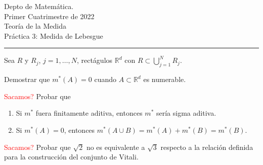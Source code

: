 \documentclass{book}
\newcommand{\rr}{\mathbb{R}}
\begin{document}


\begin{large}
\begin{bfseries} %
        \noindent Depto de Matem\'atica.\\
        Primer Cuatrimestre de 2022\\                                                                                                                                                                                                                                                                                                                                                
        Teoría de la Medida \\
        Práctica 3: Medida de Lebesgue

\end{bfseries}
\end{large}
\par\noindent\rule{\textwidth}{.5pt}










\begin{ejer}{} Sea $R$ y $R_j$, $j=1,\ldots,N$, rectágulos  $\rr^d$ con $R\subset \bigcup\limits_{j=1}^NR_j$. 
 
\end{ejer}


\begin{ejer}{}  Demostrar que  $m^*(A)=0$  cuando $A\subset\mathbb{R}^d$ es numerable.
\end{ejer}  

\begin{ejer}{}\textcolor{red}{Sacamos?} Probar que
\begin{enumerate}
\item Si $m^*$ fuera finitamente aditiva, entonces $m^*$ sería  sigma aditiva.
\item Si $m^*(A)=0$, entonces $m^*(A\cup B)=m^*(A)+m^*(B)=m^*(B)$.
\end{enumerate}
\end{ejer} 



\begin{ejer}{}\textcolor{red}{Sacamos?} Probar que $\sqrt{2}$ no es equivalente a $\sqrt{3}$ respecto a la relación definida para la construcción del conjunto de Vitali.
\end{ejer}
\end{document}
